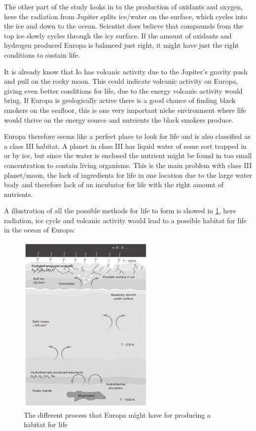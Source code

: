 The other part of the study looks in to the production of oxidants and oxygen, here the radiation from Jupiter splits ice/water on the surface, which cycles into the ice and down to the ocean. Scientist does believe that compounds from the top ice slowly cycles through the icy surface. If the amount of oxidants and hydrogen produced Europa is balanced just right, it might have just the right conditions to sustain life.

It is already know that Io has volcanic activity due to the Jupiter's gravity push and pull on the rocky moon. This could indicate volcanic activity on Europa, giving even better conditions for life, due to the energy volcanic activity would bring. If Europa is geologically active there is a good chance of finding black smokers on the seafloor, this is one very important niche environment where life would thrive on the energy source and nutrients the black smokers produce.

Europa therefore seems like a perfect place to look for life and is also classified as a class III habitat. A planet in class III has liquid water of some sort trapped in or by ice, but since the water is enclosed the nutrient might be found in too small concentration to contain living organisms. This is the main problem with class III planet/moon, the lack of ingredients for life in one location due to the large water body and therefore lack of an incubator for life with the right amount of nutrients.

A illustration of all the possible methods for life to form is showed in \ref{fig:EuropaFromSurfaceToRockcore}, here radiation, ice cycle and volcanic activity would lead to a possible habitat for life in the ocean of Europa:

\begin{figure}[htb]
  \centering
  \includegraphics[width=.48\textwidth]{figures/Life/Europasurface}
  \caption{The different process that Europa might have for producing a habitat for life\cite{LifeBeyondEarth}}
  \label{fig:EuropaFromSurfaceToRockcore}
\end{figure}

